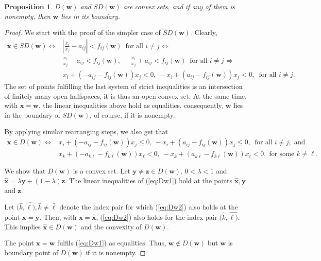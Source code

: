 \documentclass{article}
\theoremstyle{plain}
\newtheorem{proposition}{Proposition}[section]
\begin{document}
\begin{proposition} \label{proposition:DandSDareConvex}
$D(\mathbf{w})$ and $SD(\mathbf{w})$ are convex sets, and if any of them is nonempty, then $\mathbf{w}$ lies in its boundary.
\end{proposition}
\begin{proof}
We start with the proof of the simpler case of  $SD(\mathbf{w})$. Clearly,
\begin{align}
\mathbf{x}\in SD(\mathbf{w})
 \Longleftrightarrow
 &\left| \frac{x_i}{x_j} - a_{ij}\right| < f_{ij}(\mathbf{w})\ \text{ for all } i\ne j
 \Longleftrightarrow  \nonumber  \\
 &\frac{x_i}{x_j} - a_{ij} < f_{ij}(\mathbf{w}),\ -\frac{x_i}{x_j} + a_{ij} < f_{ij}(\mathbf{w})\ \text{ for all } i\ne j
 \Longleftrightarrow  \nonumber \\
 &x_i + (- a_{ij}-f_{ij}(\mathbf{w}))x_j< 0,\
 -x_i + (a_{ij}-f_{ij}(\mathbf{w}))x_j< 0,
 \ \text{ for all } i\ne j.
 \nonumber
\end{align}
The set of points fulf{\kern0pt}illing the last system of strict inequalities is an intersection of f{\kern0pt}initely many open halfspaces, it is thus an open convex set. At the same time, with $\mathbf{x} = \mathbf{w}$, the linear inequalities above hold as equalities, consequently, $\mathbf{w}$ lies in the boundary of $SD(\mathbf{w})$, of course, if it is nonempty.

By applying similar rearranging steps, we also get that
\begin{align}
\mathbf{x}\in D(\mathbf{w})
 \Longleftrightarrow
 &x_i + (- a_{ij}-f_{ij}(\mathbf{w}))x_j\le 0,\
 -x_i + (a_{ij}-f_{ij}(\mathbf{w}))x_j\le 0,
 \ \text{ for all } i\ne j, \text{ and}
 \label{eq:Dw1} %
  \\
  &x_k + (- a_{k\ell}-f_{k\ell}(\mathbf{w}))x_\ell< 0,\
 -x_k + (a_{k\ell}-f_{k\ell}(\mathbf{w}))x_\ell< 0,
 \text{ for some } k\ne \ell.
 \label{eq:Dw2} %
\end{align}

We show that $D(\mathbf{w})$ is a convex set.
Let $\mathbf{y}\ne\mathbf{z}\in D(\mathbf{w})$, $0<\lambda<1$ and
${\mathbf{\hat x}}=\lambda\mathbf{y} +
(1-\lambda )\mathbf{z}$.
The linear inequalities of (\ref{eq:Dw1}) hold at the points ${\mathbf{\hat x}}, \mathbf{y}$ and $\mathbf{z}$.

Let $(\hat{k},\hat{\ell)}, \hat{k}\ne\hat{\ell}$ denote the index pair for which (\ref{eq:Dw2}) also holds at the point $\mathbf{x}=\mathbf{y}$.
Then, with $\mathbf{x}=\mathbf{\hat x}$, (\ref{eq:Dw2}) also holds for the index pair $(\hat{k},\hat{\ell)}$.
This implies $\mathbf{\hat x}\in D(\mathbf{w})$ and the convexity of $D(\mathbf{w})$.

The point $\mathbf{x}=\mathbf{w}$ fulf{\kern0pt}ils (\ref{eq:Dw1}) as equalities. Thus, $\mathbf{w}\not\in D(\mathbf{w})$ but $\mathbf{w}$ is boundary point of $D(\mathbf{w})$ if it is nonempty.
\end{proof}
\end{document}
